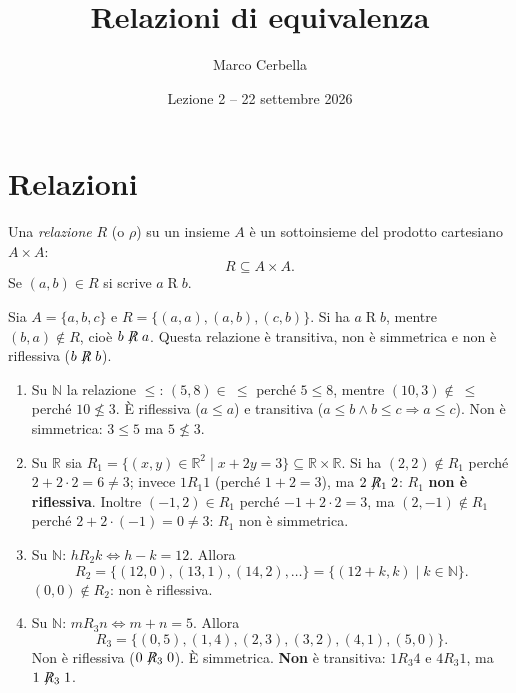 \documentclass[11pt,a4paper]{article}
\title{Relazioni di equivalenza}
\author{Marco Cerbella}
\date{Lezione 2 -- 22 settembre 2026}
\begin{document}
\maketitle

\section{Relazioni}

\begin{definizione}
Una \emph{relazione} $R$ (o $\rho$) su un insieme $A$ è un sottoinsieme del
prodotto cartesiano $A \times A$:
\[
R \subseteq A \times A.
\]
Se $(a, b) \in R$ si scrive $a \mathrel{R} b$.
\end{definizione}

\begin{esempio}
Sia $A = \{a, b, c\}$ e $R = \{(a,a), (a,b), (c,b)\}$. Si ha
$a \mathrel{R} b$, mentre $(b, a) \notin R$, cioè $b \not\mathrel{R} a$.
Questa relazione è transitiva, non è simmetrica e non è riflessiva
($b \not\mathrel{R} b$).
\end{esempio}

\begin{esempio}
\leavevmode
\begin{enumerate}
    \item Su $\mathbb{N}$ la relazione $\leq$: $(5, 8) \in\ \leq$ perché
          $5 \leq 8$, mentre $(10, 3) \notin\ \leq$ perché $10 \nleq 3$.
          È riflessiva ($a \leq a$) e transitiva
          ($a \leq b \land b \leq c \Rightarrow a \leq c$). Non è
          simmetrica: $3 \leq 5$ ma $5 \nleq 3$.

    \item Su $\mathbb{R}$ sia
          $R_1 = \{(x, y) \in \mathbb{R}^2 \mid x + 2y = 3\}
          \subseteq \mathbb{R} \times \mathbb{R}$.
          Si ha $(2, 2) \notin R_1$ perché $2 + 2 \cdot 2 = 6 \neq 3$;
          invece $1 \mathrel{R_1} 1$ (perché $1 + 2 = 3$), ma
          $2 \not\mathrel{R_1} 2$: $R_1$ \textbf{non è riflessiva}.
          Inoltre $(-1, 2) \in R_1$ perché $-1 + 2 \cdot 2 = 3$, ma
          $(2, -1) \notin R_1$ perché $2 + 2 \cdot (-1) = 0 \neq 3$:
          $R_1$ non è simmetrica.

    \item Su $\mathbb{N}$: $h \mathrel{R_2} k \iff h - k = 12$. Allora
          \[
          R_2 = \{(12, 0), (13, 1), (14, 2), \dots\}
              = \{(12 + k, k) \mid k \in \mathbb{N}\}.
          \]
          $(0, 0) \notin R_2$: non è riflessiva.

    \item Su $\mathbb{N}$: $m \mathrel{R_3} n \iff m + n = 5$. Allora
          \[
          R_3 = \{(0,5), (1,4), (2,3), (3,2), (4,1), (5,0)\}.
          \]
          Non è riflessiva ($0 \not\mathrel{R_3} 0$). È simmetrica.
          \textbf{Non} è transitiva: $1 \mathrel{R_3} 4$ e
          $4 \mathrel{R_3} 1$, ma $1 \not\mathrel{R_3} 1$.
\end{enumerate}
\end{esempio}
\end{document}
